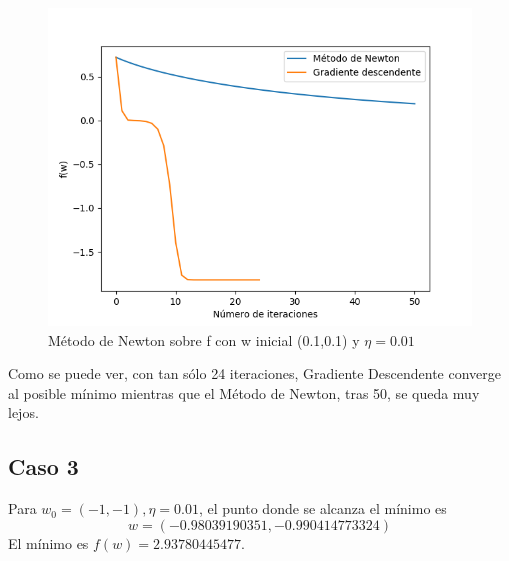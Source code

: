 \begin{figure}[H] %
	\centering
	\includegraphics[scale=0.6]{bonus2.png}  %
	\caption{Método de Newton sobre f con w inicial (0.1,0.1) y $\eta = 0.01$} 
	\label{fig:bon2}
\end{figure}

Como se puede ver, con tan sólo 24 iteraciones, Gradiente Descendente converge al posible mínimo mientras que el Método de Newton, tras 50, se queda muy lejos.

\subsection{Caso 3}

Para $w_0=(-1,-1), \eta = 0.01$, el punto donde se alcanza el mínimo es $$w=(-0.98039190351 , -0.990414773324)$$ El mínimo es $f(w) = 2.93780445477$.

